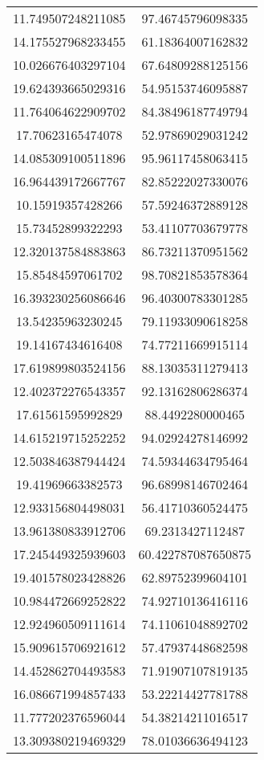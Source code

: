 \begin{table}
\begin{tabular}{cc}
11.749507248211085 & 97.46745796098335 \\
14.175527968233455 & 61.18364007162832 \\
10.026676403297104 & 67.64809288125156 \\
19.624393665029316 & 54.95153746095887 \\
11.764064622909702 & 84.38496187749794 \\
17.70623165474078 & 52.97869029031242 \\
14.085309100511896 & 95.96117458063415 \\
16.964439172667767 & 82.85222027330076 \\
10.15919357428266 & 57.59246372889128 \\
15.73452899322293 & 53.41107703679778 \\
12.320137584883863 & 86.73211370951562 \\
15.85484597061702 & 98.70821853578364 \\
16.393230256086646 & 96.40300783301285 \\
13.54235963230245 & 79.11933090618258 \\
19.14167434616408 & 74.77211669915114 \\
17.619899803524156 & 88.13035311279413 \\
12.402372276543357 & 92.13162806286374 \\
17.61561595992829 & 88.4492280000465 \\
14.615219715252252 & 94.02924278146992 \\
12.503846387944424 & 74.59344634795464 \\
19.41969663382573 & 96.68998146702464 \\
12.933156804498031 & 56.41710360524475 \\
13.961380833912706 & 69.2313427112487 \\
17.245449325939603 & 60.422787087650875 \\
19.401578023428826 & 62.89752399604101 \\
10.984472669252822 & 74.92710136416116 \\
12.924960509111614 & 74.11061048892702 \\
15.909615706921612 & 57.47937448682598 \\
14.452862704493583 & 71.91907107819135 \\
16.086671994857433 & 53.22214427781788 \\
11.777202376596044 & 54.38214211016517 \\
13.309380219469329 & 78.01036636494123 \\

\end{tabular}
\end{table}
